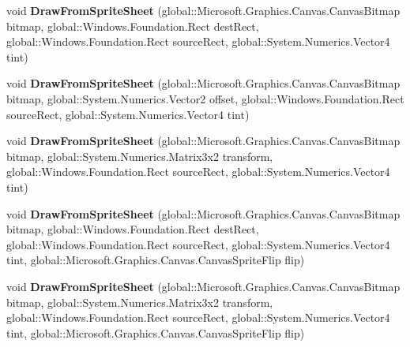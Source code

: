 \begin{DoxyCompactItemize}
void {\bfseries Draw\+From\+Sprite\+Sheet} (global\+::\+Microsoft.\+Graphics.\+Canvas.\+Canvas\+Bitmap bitmap, global\+::\+Windows.\+Foundation.\+Rect dest\+Rect, global\+::\+Windows.\+Foundation.\+Rect source\+Rect, global\+::\+System.\+Numerics.\+Vector4 tint)
\item 
\mbox{\label{interface_microsoft_1_1_graphics_1_1_canvas_1_1_i_canvas_sprite_batch_ac5ad0e2a3c2389b604549e6cb6590f9b}} 
void {\bfseries Draw\+From\+Sprite\+Sheet} (global\+::\+Microsoft.\+Graphics.\+Canvas.\+Canvas\+Bitmap bitmap, global\+::\+System.\+Numerics.\+Vector2 offset, global\+::\+Windows.\+Foundation.\+Rect source\+Rect, global\+::\+System.\+Numerics.\+Vector4 tint)
\item 
\mbox{\label{interface_microsoft_1_1_graphics_1_1_canvas_1_1_i_canvas_sprite_batch_a0c004051ad173e551e71d36d94ffd928}} 
void {\bfseries Draw\+From\+Sprite\+Sheet} (global\+::\+Microsoft.\+Graphics.\+Canvas.\+Canvas\+Bitmap bitmap, global\+::\+System.\+Numerics.\+Matrix3x2 transform, global\+::\+Windows.\+Foundation.\+Rect source\+Rect, global\+::\+System.\+Numerics.\+Vector4 tint)
\item 
\mbox{\label{interface_microsoft_1_1_graphics_1_1_canvas_1_1_i_canvas_sprite_batch_ad293d5fbb3ed75a7349a5af546ee5a77}} 
void {\bfseries Draw\+From\+Sprite\+Sheet} (global\+::\+Microsoft.\+Graphics.\+Canvas.\+Canvas\+Bitmap bitmap, global\+::\+Windows.\+Foundation.\+Rect dest\+Rect, global\+::\+Windows.\+Foundation.\+Rect source\+Rect, global\+::\+System.\+Numerics.\+Vector4 tint, global\+::\+Microsoft.\+Graphics.\+Canvas.\+Canvas\+Sprite\+Flip flip)
\item 
\mbox{\label{interface_microsoft_1_1_graphics_1_1_canvas_1_1_i_canvas_sprite_batch_a16ce9e3d6fcd3a35b2ca5ddc20b167fa}} 
void {\bfseries Draw\+From\+Sprite\+Sheet} (global\+::\+Microsoft.\+Graphics.\+Canvas.\+Canvas\+Bitmap bitmap, global\+::\+System.\+Numerics.\+Matrix3x2 transform, global\+::\+Windows.\+Foundation.\+Rect source\+Rect, global\+::\+System.\+Numerics.\+Vector4 tint, global\+::\+Microsoft.\+Graphics.\+Canvas.\+Canvas\+Sprite\+Flip flip)
\item 

\end{DoxyCompactItemize}

